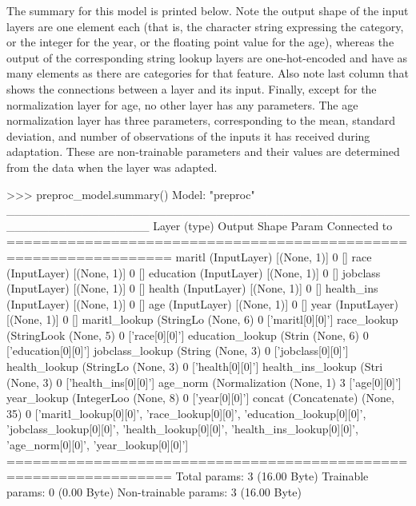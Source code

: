 The summary for this model is printed below. Note the output shape of the input layers are one element each (that is, the character string expressing the category, or the integer for the year, or the floating point value for the age), whereas the output of the corresponding string lookup layers are one-hot-encoded and have as many elements as there are categories for that feature. Also note last column that shows the connections between a layer and its input. Finally, except for the normalization layer for age, no other layer has any parameters. The age normalization layer has three parameters, corresponding to the mean, standard deviation, and number of observations of the inputs it has received during adaptation. These are non-trainable parameters and their values are determined from the data when the layer was adapted. 

\begin{samepage}
\begin{textcode}
>>> preproc_model.summary()
Model: "preproc"
_________________________________________________________________
Layer (type)            Output Shape Param Connected to                
=================================================================
maritl (InputLayer)     [(None, 1)]  0     []                            
race (InputLayer)       [(None, 1)]  0     []                            
education (InputLayer)  [(None, 1)]  0     []                            
jobclass (InputLayer)   [(None, 1)]  0     []                            
health (InputLayer)     [(None, 1)]  0     []                            
health_ins (InputLayer) [(None, 1)]  0     []                            
age (InputLayer)        [(None, 1)]  0     []                            
year (InputLayer)       [(None, 1)]  0     []                            
maritl_lookup (StringLo (None, 6)    0     ['maritl[0][0]']              
race_lookup (StringLook (None, 5)    0     ['race[0][0]']                
education_lookup (Strin (None, 6)    0     ['education[0][0]']           
jobclass_lookup (String (None, 3)    0     ['jobclass[0][0]']            
health_lookup (StringLo (None, 3)    0     ['health[0][0]']              
health_ins_lookup (Stri (None, 3)    0     ['health_ins[0][0]']          
age_norm (Normalization (None, 1)    3     ['age[0][0]']                 
year_lookup (IntegerLoo (None, 8)    0     ['year[0][0]']                
concat (Concatenate)    (None, 35)   0     ['maritl_lookup[0][0]',       
                                            'race_lookup[0][0]',         
                                            'education_lookup[0][0]',    
                                            'jobclass_lookup[0][0]',     
                                            'health_lookup[0][0]',       
                                            'health_ins_lookup[0][0]',   
                                            'age_norm[0][0]',            
                                            'year_lookup[0][0]']         
=================================================================
Total params: 3 (16.00 Byte)
Trainable params: 0 (0.00 Byte)
Non-trainable params: 3 (16.00 Byte)
\end{textcode}
\end{samepage}

